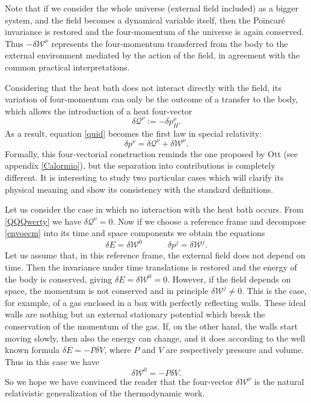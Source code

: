 \documentclass[twocolumn,usenatbib]{mnras2}
\newcommand{\spc}{\quad \quad \quad}
\begin{document}
Note that if we consider the whole universe (external field included) as a bigger system, and the field becomes a dynamical variable itself, then the Poincar\'e invariance is restored and the four-momentum of the universe is again conserved. Thus $-\delta \mathcal{W}^\nu$ represents the four-momentum transferred from the body to the external environment mediated by the action of the field, in agreement with the common practical interpretations.

Considering that the heat bath does not interact directly with the field, its variation of four-momentum can only be the outcome of a transfer to the body, which allows the introduction of a heat four-vector
\begin{equation}\label{QQQwerty}
\delta \mathcal{Q}^\nu := -\delta p_H^\nu.
\end{equation}
As a result, equation \eqref{quid} becomes the first law in special relativity:
\begin{equation}\label{envoecm}
\delta p^\nu = \delta \mathcal{Q}^\nu + \delta \mathcal{W}^\nu.
\end{equation}
Formally, this four-vectorial construction reminds the one proposed by Ott (see appendix \ref{Calormio}), but the separation into contributions is completely different. It is interesting to study two particular cases which will clarify its physical meaning and show its consistency with the standard definitions.

Let us consider the case in which no interaction with the heat bath occurs. From \eqref{QQQwerty} we have $\delta \mathcal{Q}^\nu=0$. Now if we choose a reference frame and decompose \eqref{envoecm} into its time and space components we obtain the equations
\begin{equation}
\delta E = \delta \mathcal{W}^0  \spc  \delta p^j= \delta \mathcal{W}^j.
\end{equation}
Let us assume that, in this reference frame, the external field does not depend on time. Then the invariance under time translations is restored and the energy of the body is conserved, giving $\delta E = \delta \mathcal{W}^0 =0$. However, if the field depends on space, the momentum is not conserved and in principle $\delta \mathcal{W}^j \neq 0$. This is the case, for example, of a gas enclosed in a box with perfectly reflecting walls. These ideal walls are nothing but an external stationary potential which break the conservation of the momentum of the gas. If, on the other hand, the walls start moving slowly, then also the energy can change, and it does according to the well known formula $\delta E=-P \delta V$, where $P$ and $V$ are respectively pressure and volume. Thus in this case we have
\begin{equation}
\delta \mathcal{W}^0 = -P \delta V.
\end{equation}
So we hope we have convinced the reader that the four-vector $\delta \mathcal{W}^\nu$ is the natural relativistic generalization of the thermodynamic work.
\end{document}

